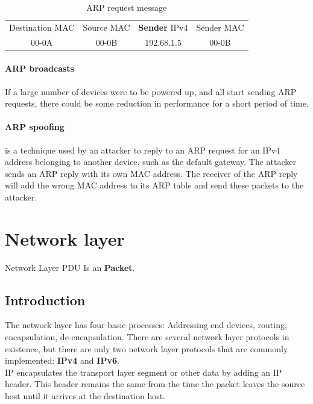\begin{table}[hbtp]
\centering\caption{ARP request message}\label{ARPreply}
\begin{tabular}{|c|c|c|c|}
\toprule
Destination MAC & Source MAC & \textbf{Sender} IPv4 & Sender MAC \\
00-0A & 00-0B & 192.68.1.5 & 00-0B \\
\bottomrule
\end{tabular}
\end{table}

\paragraph{ARP broadcasts}  If a large number of devices were to be powered up, and all start sending ARP requests, there could be some reduction in performance for a short period of time. 

\paragraph{ARP spoofing} is a technique used by an attacker to reply to an ARP request for an IPv4 address belonging to another device, such as the default gateway. The attacker sends an ARP reply with its own MAC address. The receiver of the ARP reply will add the wrong MAC address to its ARP table and send these packets to the attacker.

\section{Network layer}

Network Layer PDU Is an \textbf{Packet}.

\subsection{Introduction}

The network layer has four basic processes: Addressing end devices, routing, encapsulation, de-encapsulation. There are several network layer protocols in existence, but there are only two network layer protocols that are commonly implemented: \textbf{IPv4} and \textbf{IPv6}.\\

IP encapsulates the transport layer segment or other data by adding an IP header. This header remains the same from the time the packet leaves the source host until it arrives at the destination host.\\

